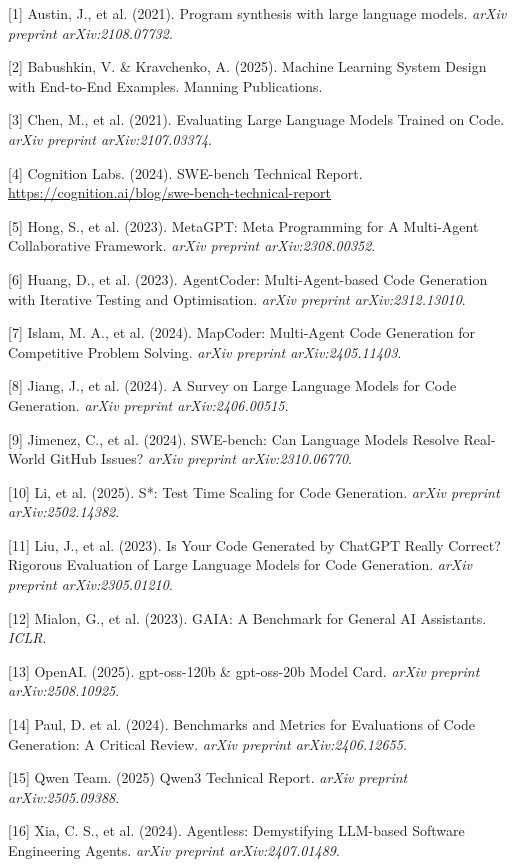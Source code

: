 \documentclass{article}
\begin{document}
[1] Austin, J., et al. (2021). Program synthesis with large language models. \textit{arXiv preprint arXiv:2108.07732}.

[2] Babushkin, V. \& Kravchenko, A. (2025). Machine Learning System Design with End-to-End Examples. Manning Publications.

[3] Chen, M., et al. (2021). Evaluating Large Language Models Trained on Code. \textit{arXiv preprint arXiv:2107.03374}.

[4] Cognition Labs. (2024). SWE-bench Technical Report. \url{https://cognition.ai/blog/swe-bench-technical-report}

[5] Hong, S., et al. (2023). MetaGPT: Meta Programming for A Multi-Agent Collaborative Framework. \textit{arXiv preprint arXiv:2308.00352}.

[6] Huang, D., et al. (2023). AgentCoder: Multi-Agent-based Code Generation with Iterative Testing and Optimisation. \textit{arXiv preprint arXiv:2312.13010}.

[7] Islam, M. A., et al. (2024). MapCoder: Multi-Agent Code Generation for Competitive Problem Solving. \textit{arXiv preprint arXiv:2405.11403}.

[8] Jiang, J., et al. (2024). A Survey on Large Language Models for Code Generation. \textit{arXiv preprint arXiv:2406.00515}.

[9] Jimenez, C., et al. (2024). SWE-bench: Can Language Models Resolve Real-World GitHub Issues? \textit{arXiv preprint arXiv:2310.06770}.

[10] Li, et al. (2025). S*: Test Time Scaling for Code Generation. \textit{arXiv preprint arXiv:2502.14382}.

[11] Liu, J., et al. (2023). Is Your Code Generated by ChatGPT Really Correct? Rigorous Evaluation of Large Language Models for Code Generation. \textit{arXiv preprint arXiv:2305.01210}.

[12] Mialon, G., et al. (2023). GAIA: A Benchmark for General AI Assistants. \textit{ICLR}.

[13] OpenAI. (2025). gpt-oss-120b \& gpt-oss-20b Model Card. \textit{arXiv preprint arXiv:2508.10925}.

[14] Paul, D. et al. (2024). Benchmarks and Metrics for Evaluations of Code Generation: A Critical Review. \textit{arXiv preprint arXiv:2406.12655}.

[15] Qwen Team. (2025) Qwen3 Technical Report. \textit{arXiv preprint arXiv:2505.09388}.

[16] Xia, C. S., et al. (2024). Agentless: Demystifying LLM-based Software Engineering Agents. \textit{arXiv preprint arXiv:2407.01489}.
\end{document}
